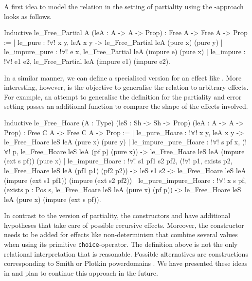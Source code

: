A first idea to model the relation in the setting of partiality using the \--approach looks as follows.

\begin{coqcode}
Inductive le_Free_Partial A (leA : A -> A -> Prop)
  : Free A -> Free A -> Prop :=
| le_pure        : !$\forall$! x y, leA x y -> le_Free_Partial leA (pure x) (pure y)
| le_impure_pure : !$\forall$! e x, le_Free_Partial leA (impure e) (pure x)
| le_impure      : !$\forall$! e1 e2, le_Free_Partial leA (impure e1) (impure e2).
\end{coqcode}

In a similar manner, we can define a specialised version for an effect like .
More interesting, however, is the objective to generalise the relation to arbitrary effects.
For example, an attempt to generalise the definition for the partiality and error setting passes an additional function to compare the shape of the effects involved.

\begin{coqcode}
Inductive le_Free_Hoare (A : Type) (leS : Sh -> Sh -> Prop)
    (leA : A -> A -> Prop) : Free C A -> Free C A -> Prop :=
| le_pure_Hoare        : !$\forall$! x y,
    leA x y -> le_Free_Hoare leS leA (pure x) (pure y)
| le_impure_pure_Hoare : !$\forall$! s pf x,
    (!$\forall$! p, le_Free_Hoare leS leA (pf p) (pure x)) ->
      le_Free_Hoare leS leA (impure (ext s pf)) (pure x)
| le_impure_Hoare      : !$\forall$! s1 pf1 s2 pf2,
    (!$\forall$! p1, exists p2, le_Free_Hoare leS leA (pf1 p1) (pf2 p2)) ->
    leS s1 s2 ->
    le_Free_Hoare leS leA (impure (ext s1 pf1)) (impure (ext s2 pf2))
| le_pure_impure_Hoare : !$\forall$! x s pf,
    (exists p : Pos s, le_Free_Hoare leS leA (pure x) (pf p)) ->
      le_Free_Hoare leS leA (pure x) (impure (ext s pf)).
\end{coqcode}

In contrast to the version of partiality, the constructors  and  have additional hypotheses that take care of possible recursive effects.
Moreover, the constructor  needs to be added for effects like non\--determinism that combine several values when using its primitive \texttt{choice}\--operator.
The definition above is not the only relational interpretation that is reasonable.
Possible alternatives are constructions corresponding to Smith or Plotkin powerdomains \citep{abramsky1994domain}.
We have presented these ideas in \citet{christiansen2019proving} and plan to continue this approach in the future.


